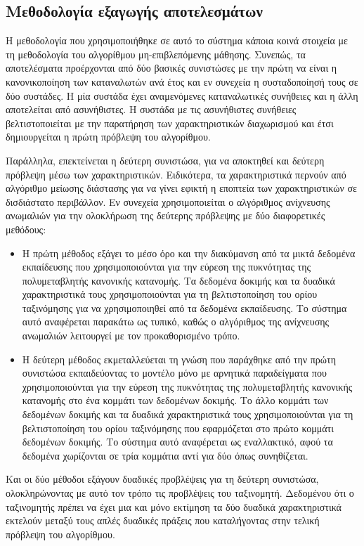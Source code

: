 \subsection{Μεθοδολογία εξαγωγής αποτελεσμάτων}
Η μεθοδολογία που χρησιμοποιήθηκε σε αυτό το σύστημα κάποια κοινά στοιχεία με τη μεθοδολογία του αλγορίθμου μη-επιβλεπόμενης μάθησης. Συνεπώς, τα αποτελέσματα προέρχονται από δύο βασικές συνιστώσες με την πρώτη να είναι η κανονικοποίηση των καταναλωτών ανά έτος και εν συνεχεία η συσταδοποίησή τους σε δύο συστάδες. Η μία συστάδα έχει αναμενόμενες καταναλωτικές συνήθειες και η άλλη αποτελείται από ασυνήθιστες. H συστάδα με τις ασυνήθιστες συνήθειες βελτιστοποιείται με την παρατήρηση των χαρακτηριστικών διαχωρισμού και έτσι δημιουργείται η πρώτη πρόβλεψη του αλγορίθμου.\par
Παράλληλα, επεκτείνεται η δεύτερη συνιστώσα, για να αποκτηθεί και δεύτερη πρόβλεψη μέσω των χαρακτηριστικών. Ειδικότερα, τα χαρακτηριστικά περνούν από αλγόριθμο μείωσης διάστασης για να γίνει εφικτή η εποπτεία των χαρακτηριστικών σε δισδιάστατο περιβάλλον. Εν συνεχεία χρησιμοποιείται ο αλγόριθμος ανίχνευσης ανωμαλιών για την ολοκλήρωση της δεύτερης πρόβλεψης με δύο διαφορετικές μεθόδους:
\begin{itemize}
\item Η πρώτη μέθοδος εξάγει το μέσο όρο και την διακύμανση από τα μικτά δεδομένα εκπαίδευσης που χρησιμοποιούνται για την εύρεση της πυκνότητας της πολυμεταβλητής κανονικής κατανομής. Τα δεδομένα δοκιμής και τα δυαδικά χαρακτηριστικά τους χρησιμοποιούνται για τη βελτιστοποίηση του ορίου ταξινόμησης για να χρησιμοποιηθεί από τα δεδομένα εκπαίδευσης. Το σύστημα αυτό αναφέρεται παρακάτω ως τυπικό, καθώς ο αλγόριθμος της ανίχνευσης ανωμαλιών λειτουργεί με τον προκαθορισμένο τρόπο.
\item Η δεύτερη μέθοδος εκμεταλλεύεται τη γνώση που παράχθηκε από την πρώτη συνιστώσα εκπαιδεύοντας το μοντέλο μόνο με αρνητικά παραδείγματα που χρησιμοποιούνται για την εύρεση της πυκνότητας της πολυμεταβλητής κανονικής κατανομής στο ένα κομμάτι των δεδομένων δοκιμής. Το άλλο κομμάτι των δεδομένων δοκιμής και τα δυαδικά χαρακτηριστικά τους χρησιμοποιούνται για τη βελτιστοποίηση του ορίου ταξινόμησης που εφαρμόζεται στο πρώτο κομμάτι δεδομένων δοκιμής. Το σύστημα αυτό αναφέρεται ως εναλλακτικό, αφού τα δεδομένα χωρίζονται σε τρία κομμάτια αντί για δύο όπως συνηθίζεται.
\end{itemize}
\par Και οι δύο μέθοδοι εξάγουν δυαδικές προβλέψεις για τη δεύτερη συνιστώσα, ολοκληρώνοντας με αυτό τον τρόπο τις προβλέψεις του ταξινομητή. Δεδομένου ότι ο ταξινομητής πρέπει να έχει μια και μόνο εκτίμηση τα δύο δυαδικά χαρακτηριστικά εκτελούν μεταξύ τους απλές δυαδικές πράξεις που καταλήγοντας στην τελική πρόβλεψη του αλγορίθμου.
